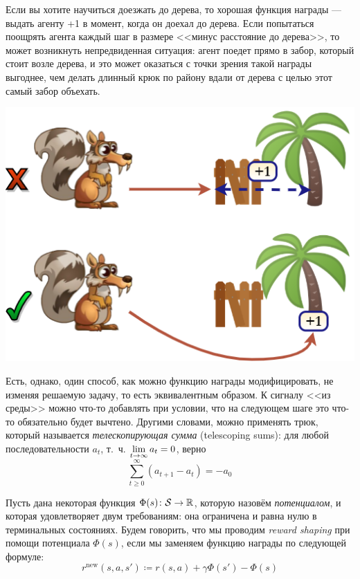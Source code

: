 \begin{exampleBox}[righthand ratio=0.35, sidebyside, sidebyside align=center, lower separated=false]{}
Если вы хотите научиться доезжать до дерева, то хорошая функция награды --- выдать агенту +1 в момент, когда он доехал до дерева. Если попытаться поощрять агента каждый шаг в размере <<минус расстояние до дерева>>, то может возникнуть непредвиденная ситуация: агент поедет прямо в забор, который стоит возле дерева, и это может оказаться с точки зрения такой награды выгоднее, чем делать длинный крюк по району вдали от дерева с целью этот самый забор объехать. 

\tcblower
\includegraphics[width=\textwidth]{Images/Tree.png}
\end{exampleBox}

Есть, однако, один способ, как можно функцию награды модифицировать, не изменяя решаемую задачу, то есть эквивалентным образом. К сигналу <<из среды>> можно что-то добавлять при условии, что на следующем шаге это что-то обязательно будет вычтено. Другими словами, можно применять трюк, который называется \emph{телескопирующая сумма} (telescoping sums): для любой последовательности $a_t$, т.~ч. $\lim\limits_{t \to \infty} a_t \HM= 0$, верно
\begin{equation}\label{telescopingsum}
    \sum_{t \ge 0}^\infty \left( a_{t+1} - a_t \right) = -a_0
\end{equation}

\begin{definition}
Пусть дана некоторая функция $\Phi(s) \colon \mathcal{S} \to \mathbb{R}$, которую назовём \emph{потенциалом}, и которая удовлетворяет двум требованиям: она ограничена и равна нулю в терминальных состояниях. Будем говорить, что мы проводим \emph{reward shaping} при помощи потенциала $\Phi(s)$, если мы заменяем функцию награды по следующей формуле:
\begin{equation}\label{rewardshaping}
r^{\mathrm{new}}(s, a, s') \coloneqq r(s, a) + \gamma \Phi(s') - \Phi(s)    
\end{equation}
\end{definition}

